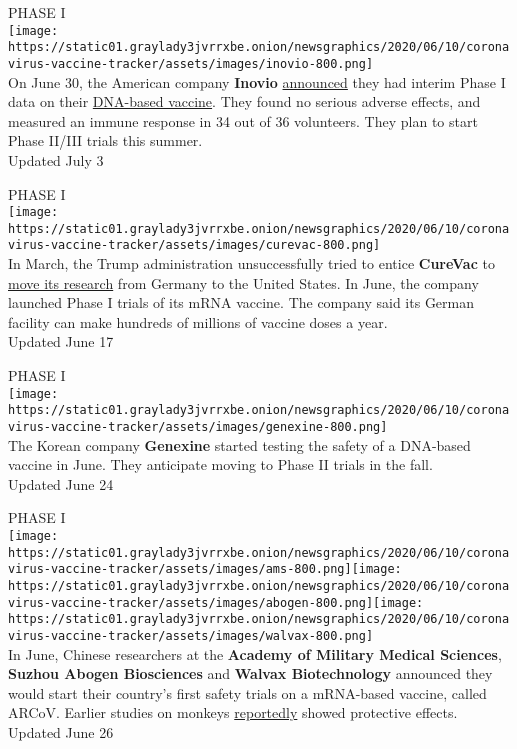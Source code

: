 PHASE I\\
\texttt{[image: https://static01.graylady3jvrrxbe.onion/newsgraphics/2020/06/10/coronavirus-vaccine-tracker/assets/images/inovio-800.png]}\\
On June 30, the American company \textbf{Inovio}
\href{http://ir.inovio.com/news-releases/news-releases-details/2020/INOVIO-Announces-Positive-Interim-Phase-1-Data-For-INO-4800-Vaccine-for-COVID-19/default.aspx}{announced}
they had interim Phase I data on their
\href{https://www.nytimes3xbfgragh.onion/2020/06/13/science/vaccine-coronavirus-inovio.html}{DNA-based
vaccine}. They found no serious adverse effects, and measured an immune
response in 34 out of 36 volunteers. They plan to start Phase II/III
trials this summer.\\
Updated July 3

PHASE I\\
\texttt{[image: https://static01.graylady3jvrrxbe.onion/newsgraphics/2020/06/10/coronavirus-vaccine-tracker/assets/images/curevac-800.png]}\\
In March, the Trump administration unsuccessfully tried to entice
\textbf{CureVac} to
\href{https://www.nytimes3xbfgragh.onion/2020/03/15/world/europe/cornonavirus-vaccine-us-germany.html}{move
its research} from Germany to the United States. In June, the company
launched Phase I trials of its mRNA vaccine. The company said its German
facility can make hundreds of millions of vaccine doses a year.\\
Updated June 17

PHASE I\\
\texttt{[image: https://static01.graylady3jvrrxbe.onion/newsgraphics/2020/06/10/coronavirus-vaccine-tracker/assets/images/genexine-800.png]}\\
The Korean company \textbf{Genexine} started testing the safety of a
DNA-based vaccine in June. They anticipate moving to Phase II trials in
the fall.\\
Updated June 24

PHASE I\\
\texttt{[image: https://static01.graylady3jvrrxbe.onion/newsgraphics/2020/06/10/coronavirus-vaccine-tracker/assets/images/ams-800.png]}\texttt{[image: https://static01.graylady3jvrrxbe.onion/newsgraphics/2020/06/10/coronavirus-vaccine-tracker/assets/images/abogen-800.png]}\texttt{[image: https://static01.graylady3jvrrxbe.onion/newsgraphics/2020/06/10/coronavirus-vaccine-tracker/assets/images/walvax-800.png]}\\
In June, Chinese researchers at the \textbf{Academy of Military Medical
Sciences}, \textbf{Suzhou Abogen Biosciences} and \textbf{Walvax
Biotechnology} announced they would start their country's first safety
trials on a mRNA-based vaccine, called ARCoV. Earlier studies on monkeys
\href{https://news.cgtn.com/news/2020-06-26/China-s-first-COVID-19-mRNA-vaccine-approved-for-clinical-trials-RDTXX0jVJK/index.html}{reportedly}
showed protective effects.\\
Updated June 26

